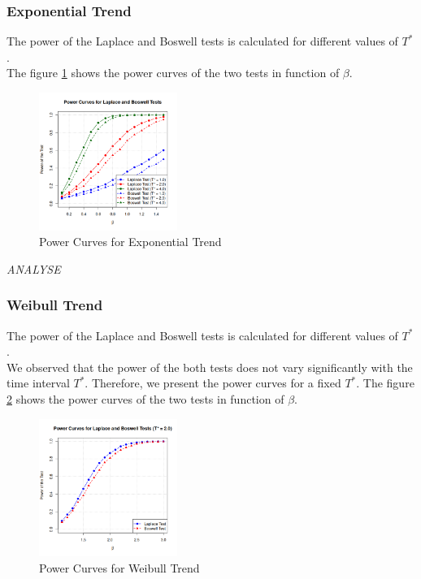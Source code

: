 \documentclass{journalstyle}
\begin{document}
\subsubsection{Exponential Trend}

The power of the Laplace and Boswell tests is calculated for different values of $T^*$. \\
The figure \ref{fig:power_exponential_beta} shows the power curves of the two tests in function of $\beta$. \\
\begin{figure}[H]
    \centering
    \includegraphics[width=0.4\textwidth]{src/power_exponential.png}
    \caption{Power Curves for Exponential Trend}
    \label{fig:power_exponential_beta}
\end{figure}

\textit{ANALYSE}


\subsubsection{Weibull Trend}

The power of the Laplace and Boswell tests is calculated for different values of $T^*$. \\
We observed that the power of the both tests does not vary significantly with the time interval $T^*$.
Therefore, we present the power curves for a fixed $T^*$.
The figure \ref{fig:power_weibull_beta} shows the power curves of the two tests in function of $\beta$. \\
\begin{figure}[H]
    \centering
    \includegraphics[width=0.4\textwidth]{src/power_weibull.png}
    \caption{Power Curves for Weibull Trend}
    \label{fig:power_weibull_beta}
\end{figure}
\end{document}
